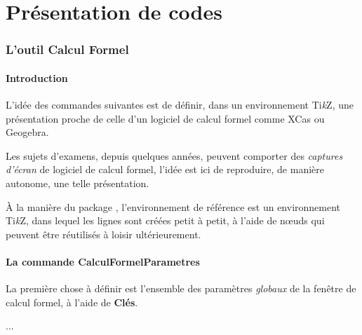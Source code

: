 \documentclass[a4paper,french,11pt]{article}
\providecommand\tikzlogo{Ti\textit{k}Z}
\let\TikZ\tikzlogo
\newcommand\ctex[1]{\tcbox[vignettelatex]{#1}}
\newcommand\Cle[1]{{\bfseries\sffamily\textlangle #1\textrangle}}
\begin{document}
\newpage

\part{Présentation de codes}

\section{L'outil \og Calcul Formel \fg}

\subsection{Introduction}

\begin{codeidee}
L'idée des commandes suivantes est de définir, dans un environnement \TikZ, une présentation proche de celle d'un logiciel de calcul formel comme \textsf{XCas} ou \textsf{Geogebra}.

\smallskip

Les sujets d'examens, depuis quelques années, peuvent comporter des \textit{captures d'écran} de logiciel de calcul formel, l'idée est ici de reproduire, de manière autonome, une telle présentation.

\smallskip

À la manière du {package} \ctex{tkz-tab}, l'environnement de référence est un environnement \TikZ, dans lequel les lignes sont créées petit à petit, à l'aide de nœuds qui peuvent être réutilisés à loisir ultérieurement.
\end{codeidee}

\subsection{La commande \og CalculFormelParametres \fg}

\begin{codeinfo}
La première chose à définir est l'ensemble des paramètres \textit{globaux} de la fenêtre de calcul formel, à l'aide de \Cle{Clés}.
\end{codeinfo}

\begin{codetex}
...
\end{codetex}
\end{document}
